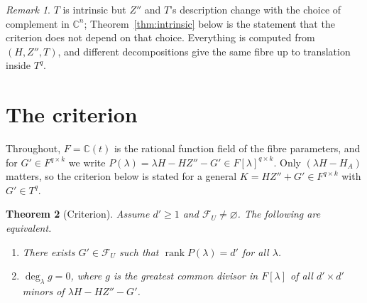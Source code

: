 \documentclass[journal]{IEEEtran}
\theoremstyle{plainn}
\newtheorem{thm}{Theorem}
\theoremstyle{remark}
\newtheorem{remark}[thm]{Remark}
\begin{document}
\begin{remark}\label{rem:T-invariant}
$T$ is intrinsic but $Z''$ and $T$'s description change with the choice of complement in
$\mathbb C^n$; Theorem~\ref{thm:intrinsic} below is the statement that the criterion does not depend
on that choice. Everything is computed from $(H,Z'',T)$, and different decompositions give the same
fibre up to translation inside $T^{q}$.
\end{remark}

\section{The criterion}\label{sec:criterion}

Throughout, $F=\mathbb C(t)$ is the rational function field of the fibre parameters, and for
$G'\in F^{q\times k}$ we write $P(\lambda)=\lambda H-HZ''-G'\in F[\lambda]^{q\times k}$. Only
$(\lambda H-H_A)$ matters, so the criterion below is stated for a general $K=HZ''+G'\in F^{q\times
k}$ with $G'\in T^{q}$.

\begin{thm}[Criterion]\label{thm:criterion}
Assume $d'\ge1$ and $\mathcal F_U\ne\varnothing$. The following are equivalent.
\begin{enumerate}[label=(\roman*),leftmargin=2.2em,itemsep=1pt]
\item There exists $G'\in\mathcal F_U$ such that $\operatorname{rank}P(\lambda)=d'$ for all
$\lambda$.
\item $\deg_\lambda g=0$, where $g$ is the greatest common divisor in $F[\lambda]$ of all $d'\times
d'$ minors of $\lambda H-HZ''-G'$.
\end{enumerate}
\end{thm}
\end{document}
